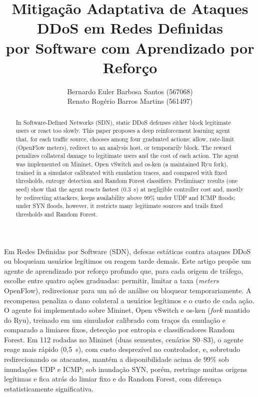 \documentclass[12pt]{article}
\title{Mitigação Adaptativa de Ataques DDoS em Redes Definidas\\
  por Software com Aprendizado por Reforço}
\author{Bernardo Euler Barbosa Santos (567068)\inst{1}\\ Renato Rogério Barros Martins (561497)\inst{1}}
\begin{document}
\maketitle

\begin{abstract}
  In Software-Defined Networks (SDN), static DDoS defenses either block
  legitimate users or react too slowly. This paper proposes a deep
  reinforcement learning agent that, for each traffic source, chooses among
  four graduated actions: allow, rate-limit (OpenFlow meters), redirect to an
  analysis host, or temporarily block. The reward penalizes collateral damage
  to legitimate users and the cost of each action. The agent was implemented
  on Mininet, Open vSwitch and os-ken (a maintained Ryu fork), trained in a
  simulator calibrated with emulation traces, and compared with fixed
  thresholds, entropy detection and Random Forest classifiers.
  Preliminary results (one seed) show that the agent reacts fastest (0.3~s) at negligible controller cost and, mostly by redirecting attackers, keeps availability above 99\% under UDP and ICMP floods; under SYN floods, however, it restricts many legitimate sources and trails fixed thresholds and Random Forest.
\end{abstract}

\begin{resumo}
  Em Redes Definidas por Software (SDN), defesas estáticas contra ataques DDoS
  ou bloqueiam usuários legítimos ou reagem tarde demais. Este artigo propõe um
  agente de aprendizado por reforço profundo que, para cada origem de tráfego,
  escolhe entre quatro ações graduadas: permitir, limitar a taxa
  (\textit{meters} OpenFlow), redirecionar para um nó de análise ou bloquear
  temporariamente. A recompensa penaliza o dano colateral a usuários legítimos
  e o custo de cada ação. O agente foi implementado sobre Mininet, Open vSwitch
  e os-ken (\textit{fork} mantido do Ryu), treinado em um simulador calibrado
  com traços da emulação e comparado a limiares fixos, detecção por entropia e
  classificadores Random Forest. Em 112 rodadas no Mininet (duas sementes, cenários S0--S3), o agente reage mais rápido (0,5~s), com custo desprezível no controlador, e, sobretudo redirecionando os atacantes, mantém a disponibilidade acima de 99\% sob inundações UDP e ICMP; sob inundação SYN, porém, restringe muitas origens legítimas e fica atrás do limiar fixo e do Random Forest, com diferença estatisticamente significativa.
\end{resumo}
\end{document}
